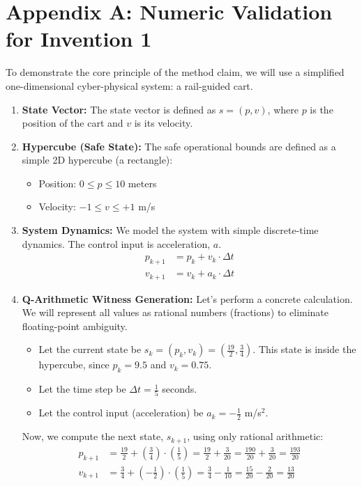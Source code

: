 \documentclass{article}
\begin{document}
\section{Appendix A: Numeric Validation for Invention 1}

To demonstrate the core principle of the method claim, we will use a simplified one-dimensional cyber-physical system: a rail-guided cart.

\begin{enumerate}
    \item \textbf{State Vector:} The state vector is defined as $s = (p, v)$, where $p$ is the position of the cart and $v$ is its velocity.

    \item \textbf{Hypercube (Safe State):} The safe operational bounds are defined as a simple 2D hypercube (a rectangle):
    \begin{itemize}
        \item Position: $0 \le p \le 10$ meters
        \item Velocity: $-1 \le v \le +1$ m/s
    \end{itemize}

    \item \textbf{System Dynamics:} We model the system with simple discrete-time dynamics. The control input is acceleration, $a$.
    \begin{align*}
        p_{k+1} &= p_k + v_k \cdot \Delta t \\
        v_{k+1} &= v_k + a_k \cdot \Delta t
    \end{align*}

    \item \textbf{Q-Arithmetic Witness Generation:} Let's perform a concrete calculation. We will represent all values as rational numbers (fractions) to eliminate floating-point ambiguity.
    \begin{itemize}
        \item Let the current state be $s_k = (p_k, v_k) = (\frac{19}{2}, \frac{3}{4})$. This state is inside the hypercube, since $p_k=9.5$ and $v_k=0.75$.
        \item Let the time step be $\Delta t = \frac{1}{5}$ seconds.
        \item Let the control input (acceleration) be $a_k = -\frac{1}{2}$ m/s$^2$.
    \end{itemize}
    Now, we compute the next state, $s_{k+1}$, using only rational arithmetic:
    \begin{align*}
        p_{k+1} &= \frac{19}{2} + \left(\frac{3}{4}\right) \cdot \left(\frac{1}{5}\right) = \frac{19}{2} + \frac{3}{20} = \frac{190}{20} + \frac{3}{20} = \frac{193}{20} \\
        v_{k+1} &= \frac{3}{4} + \left(-\frac{1}{2}\right) \cdot \left(\frac{1}{5}\right) = \frac{3}{4} - \frac{1}{10} = \frac{15}{20} - \frac{2}{20} = \frac{13}{20}
    \end{align*}


\end{enumerate}
\end{document}
